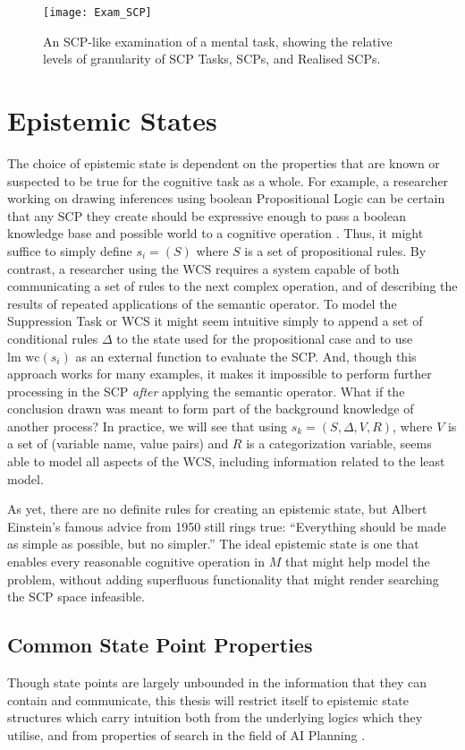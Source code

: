 \begin{figure}
\begin{center}
\texttt{[image: Exam\_SCP]}
\end{center}
\caption{An SCP-like examination of a mental task, showing the relative levels of granularity of SCP Tasks, SCPs, and Realised SCPs.}
\label{fig:scpExam}
\end{figure}

\section{Epistemic States}
The choice of epistemic state is dependent on the properties that are known or suspected to be true for the cognitive task as a whole. For example, a researcher working on drawing inferences using boolean Propositional Logic can be certain that any SCP they create should be expressive enough to pass a boolean knowledge base and possible world to a cognitive operation . Thus, it might suffice to simply define $s_i=(S)$ where $S$ is a set of propositional rules. By contrast, a researcher using the WCS requires a system capable of both communicating a set of rules to the next complex operation, and of describing the results of repeated applications of the semantic operator. To model the Suppression Task or WCS it might seem intuitive simply to append a set of conditional rules $\Delta$ to the state used for the propositional case and to use $\text{lm wc}(s_i)$ as an external function to evaluate the SCP. And, though this approach works for many examples, it makes it impossible to perform further processing in the SCP \textit{after} applying the semantic operator. What if the conclusion drawn was meant to form part of the background knowledge of another process? In practice, we will see that using $s_k=(S,\Delta,V, R)$, where $V$ is a set of (variable name, value pairs) and $R$ is a categorization variable, seems able to model all aspects of the WCS, including information related to the least model. 

As yet, there are no definite rules for creating an epistemic state, but Albert Einstein's famous advice from 1950 still rings true: ``Everything should be made as simple as possible, but no simpler.'' The ideal epistemic state is one that enables every reasonable cognitive operation in $M$ that might help model the problem, without adding superfluous functionality that might render searching the SCP space infeasible.

\subsection{Common State Point Properties} \label{ssec:epiprops}
Though state points are largely unbounded in the information that they can contain and communicate, this thesis will restrict itself to epistemic state structures which carry intuition both from the underlying logics which they utilise, and from properties of search in the field of AI Planning \citep{korf1987planning}.

